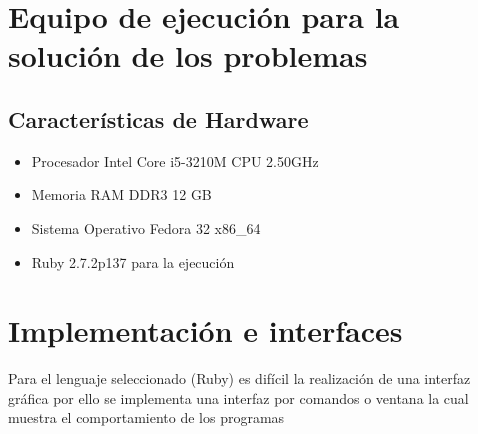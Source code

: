 \documentclass[10pt]{article}
\begin{document}
\section{Equipo de ejecución para la solución de los problemas}
\subsection{Características de Hardware}
\begin{itemize}
  \item Procesador Intel Core i5-3210M CPU 2.50GHz
  \item Memoria RAM DDR3 12 GB
  \item Sistema Operativo Fedora 32 x86\_64
  \item Ruby 2.7.2p137 para la ejecución
\end{itemize}
\section{Implementación e interfaces}
Para el lenguaje seleccionado (Ruby) es difícil la realización de una interfaz gráfica por ello se implementa una interfaz por comandos o ventana la cual muestra el comportamiento de los programas
\end{document}
